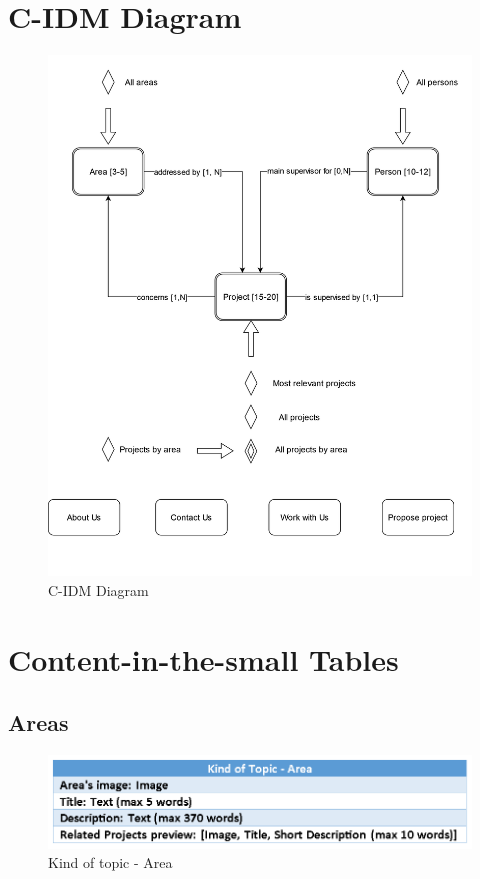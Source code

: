 \documentclass[11pt, letterpaper]{article}
\begin{document}
\section{C-IDM Diagram}
\begin{figure}[H]
    \centering
    \includegraphics[width=15cm]{images/Hyper_Design-C-IDM.png}
    \caption{C-IDM Diagram}
    \label{fig:enter-label}
\end{figure}
\section{Content-in-the-small Tables}
\subsection{Areas}
\begin{figure}[H]
    \centering
    \includegraphics[width=15cm]{images/Content_in_the_small/Kind_of_topic-areas.png}
    \caption{Kind of topic - Area}
    \label{fig:enter-label}
\end{figure}
\end{document}
